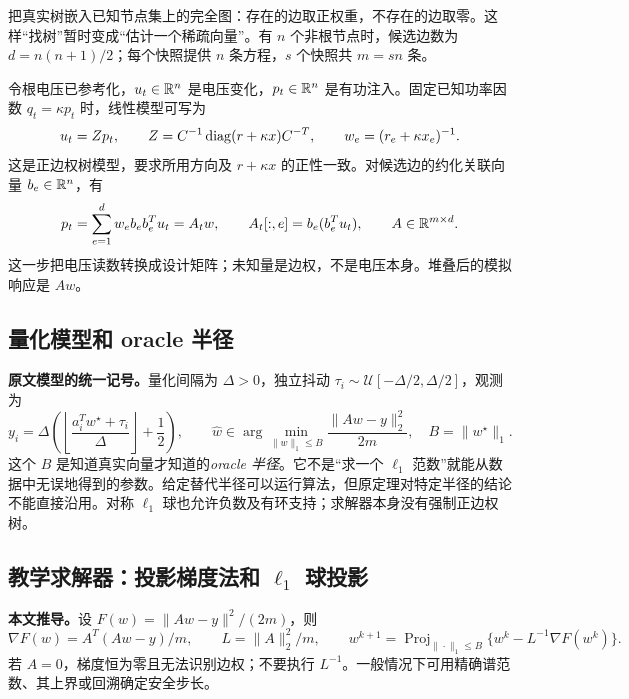 把真实树嵌入已知节点集上的完全图：存在的边取正权重，不存在的边取零。这样“找树”暂时变成“估计一个稀疏向量”。有 $n$ 个非根节点时，候选边数为 $d=n(n+1)/2$；每个快照提供 $n$ 条方程，$s$ 个快照共 $m=sn$ 条。

令根电压已参考化，$u_t\in\mathbb{R}^n$ 是电压变化，$p_t\in\mathbb{R}^n$ 是有功注入。固定已知功率因数 $q_t=\kappa p_t$ 时，线性模型可写为
\begin{equation}
 u_t=Zp_t,\qquad Z=C^{-1}\operatorname{diag}(r+\kappa x)C^{-T},\qquad
 w_e=(r_e+\kappa x_e)^{-1}.
 \label{eq:dq_s7_network}
\end{equation}
这是正边权树模型，要求所用方向及 $r+\kappa x$ 的正性一致。对候选边的约化关联向量 $b_e\in\mathbb{R}^n$，有
\begin{equation}
 p_t=\sum_{e=1}^d w_eb_eb_e^Tu_t=A_tw,\qquad
 A_t[:,e]=b_e(b_e^Tu_t),\qquad A\in\mathbb{R}^{m\times d}.
 \label{eq:dq_s7_design}
\end{equation}
这一步把电压读数转换成设计矩阵；未知量是边权，不是电压本身。堆叠后的模拟响应是 $Aw$。

\subsection{量化模型和 oracle 半径}

\textbf{原文模型的统一记号。}量化间隔为 $\Delta>0$，独立抖动
$\tau_i\sim\mathcal U[-\Delta/2,\Delta/2]$，观测为
\begin{equation}
 y_i=\Delta\left(\left\lfloor\frac{a_i^Tw^\star+\tau_i}{\Delta}\right\rfloor+\frac12\right),
 \qquad
 \hat w\in\arg\min_{\|w\|_1\le B}\frac{\|Aw-y\|_2^2}{2m},
 \quad B=\|w^\star\|_1.
 \label{eq:dq_s7_estimator}
\end{equation}
这个 $B$ 是知道真实向量才知道的\emph{oracle 半径}。它不是“求一个 $\ell_1$ 范数”就能从数据中无误地得到的参数。给定替代半径可以运行算法，但原定理对特定半径的结论不能直接沿用。对称 $\ell_1$ 球也允许负数及有环支持；求解器本身没有强制正边权树。

\subsection{教学求解器：投影梯度法和 \texorpdfstring{$\ell_1$}{l1} 球投影}

\textbf{本文推导。}设 $F(w)=\|Aw-y\|^2/(2m)$，则
\begin{equation}
 \nabla F(w)=A^T(Aw-y)/m,\qquad
 L=\|A\|_2^2/m,\qquad
 w^{k+1}=\operatorname{Proj}_{\|\cdot\|_1\le B}
                 \{w^k-L^{-1}\nabla F(w^k)\}.
 \label{eq:dq_s7_pg}
\end{equation}
若 $A=0$，梯度恒为零且无法识别边权；不要执行 $L^{-1}$。一般情况下可用精确谱范数、其上界或回溯确定安全步长。

